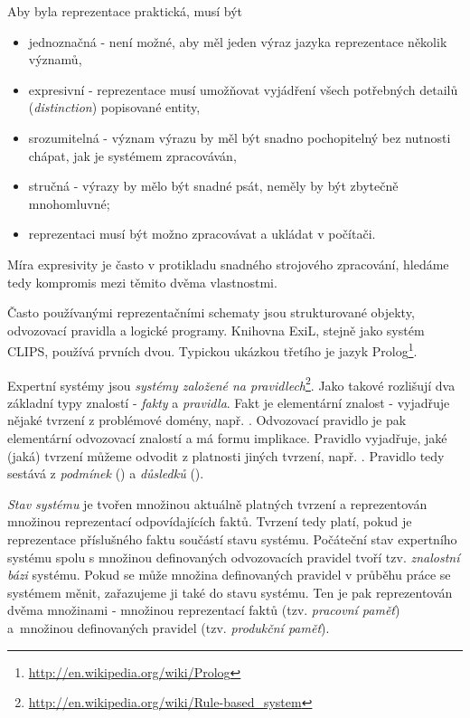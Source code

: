 Aby byla reprezentace praktická, musí být
\begin{itemize}
  \item jednoznačná - není možné, aby měl jeden výraz jazyka reprezentace
    několik významů,
  \item expresivní - reprezentace musí umožňovat vyjádření všech potřebných
    detailů (\emph{distinction}) popisované entity,
  \item srozumitelná - význam výrazu by měl být snadno pochopitelný bez
    nutnosti chápat, jak je systémem zpracováván,
  \item stručná - výrazy by mělo být snadné psát, neměly by být zbytečně
    mnohomluvné;
  \item reprezentaci musí být možno zpracovávat a ukládat v počítači.
\end{itemize}
Míra expresivity je často v protikladu snadného strojového zpracování, hledáme
tedy kompromis mezi těmito dvěma vlastnostmi.

Často používanými reprezentačními schematy jsou strukturované objekty,
odvozovací pravidla a logické programy. Knihovna ExiL, stejně jako systém CLIPS,
používá prvních dvou. Typickou ukázkou třetího je jazyk
Prolog\footnote{\url{http://en.wikipedia.org/wiki/Prolog}}.

Expertní systémy jsou \emph{systémy založené na
pravidlech}\footnote{\url{http://en.wikipedia.org/wiki/Rule-based\_system}}.
Jako takové rozlišují dva základní typy znalostí - \emph{fakty} a
\emph{pravidla}. Fakt je elementární  znalost - vyjadřuje nějaké
tvrzení z problémové domény, např. . Odvozovací pravidlo je
pak elementární odvozovací znalostí a má formu implikace. Pravidlo vyjadřuje,
jaké (jaká) tvrzení můžeme odvodit z platnosti jiných tvrzení, např. . Pravidlo tedy sestává z \emph{podmínek} () a \emph{důsledků} ().

\emph{Stav systému} je tvořen množinou aktuálně platných tvrzení a reprezentován
množinou reprezentací odpovídajících faktů. Tvrzení tedy platí, pokud je
reprezentace příslušného faktu součástí stavu systému. Počáteční stav
expertního systému spolu s množinou definovaných odvozovacích pravidel tvoří
tzv. \emph{znalostní bázi} systému. Pokud se může množina definovaných pravidel
v průběhu práce se systémem měnit, zařazujeme ji také do stavu systému. Ten je
pak reprezentován dvěma množinami - množinou reprezentací faktů (tzv.
\emph{pracovní paměť}) a~množinou definovaných pravidel (tzv. \emph{produkční
paměť}).


